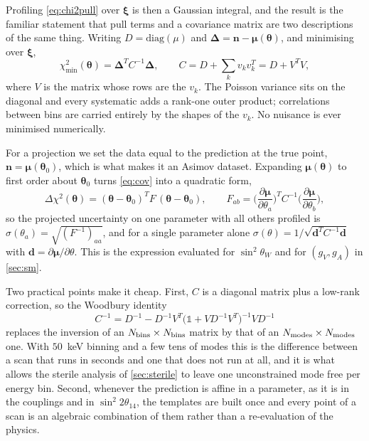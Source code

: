 \documentclass[aps,prd,superscriptaddress,nofootinbib,longbibliography,notitlepage,11pt]{revtex4-2}
\newcommand{\sw}{\sin^2\theta_W}
\newcommand{\st}[1]{\sin^2 2\theta_{#1}}
\begin{document}
Profiling \cref{eq:chi2pull} over $\bm\xi$ is then a Gaussian integral, and the result is
the familiar statement that pull terms and a covariance matrix are two descriptions of the
same thing.  Writing $D=\mathrm{diag}(\mu)$ and $\bm\Delta=\bm n-\bm\mu(\bm\theta)$, and
minimising over $\bm\xi$,
\begin{equation}
\chi^2_{\min}(\bm\theta)=\bm\Delta^{T}C^{-1}\bm\Delta,
\qquad
C=D+\sum_k v_kv_k^{T}=D+V^{T}V,
\label{eq:cov}
\end{equation}
where $V$ is the matrix whose rows are the $v_k$.  The Poisson variance sits on the
diagonal and every systematic adds a rank-one outer product; correlations between bins are
carried entirely by the shapes of the $v_k$.  No nuisance is ever minimised numerically.

For a projection we set the data equal to the prediction at the true point,
$\bm n=\bm\mu(\bm\theta_0)$, which is what makes it an Asimov dataset.  Expanding
$\bm\mu(\bm\theta)$ to first order about $\bm\theta_0$ turns \cref{eq:cov} into a quadratic
form,
\begin{equation}
\Delta\chi^2(\bm\theta)=(\bm\theta-\bm\theta_0)^{T}F\,(\bm\theta-\bm\theta_0),
\qquad
F_{ab}=\Big(\frac{\partial\bm\mu}{\partial\theta_a}\Big)^{T}C^{-1}
\Big(\frac{\partial\bm\mu}{\partial\theta_b}\Big),
\label{eq:fisher}
\end{equation}
so the projected uncertainty on one parameter with all others profiled is
$\sigma(\theta_a)=\sqrt{(F^{-1})_{aa}}$, and for a single parameter alone
$\sigma(\theta)=1/\sqrt{\bm d^{T}C^{-1}\bm d}$ with $\bm d=\partial\bm\mu/\partial\theta$.
This is the expression evaluated for $\sw$ and for $(g_V,g_A)$ in \cref{sec:sm}.

Two practical points make it cheap.  First, $C$ is a diagonal matrix plus a low-rank
correction, so the Woodbury identity
\begin{equation}
C^{-1}=D^{-1}-D^{-1}V^{T}\big(\mathbb{1}+VD^{-1}V^{T}\big)^{-1}VD^{-1}
\label{eq:woodbury}
\end{equation}
replaces the inversion of an $N_{\rm bins}\times N_{\rm bins}$ matrix by that of an
$N_{\rm modes}\times N_{\rm modes}$ one.  With $50$~keV binning and a few tens of modes this
is the difference between a scan that runs in seconds and one that does not run at all, and
it is what allows the sterile analysis of \cref{sec:sterile} to leave one unconstrained mode
free per energy bin.  Second, whenever the prediction is affine in a parameter, as it is in
the couplings and in $\st{14}$, the templates are built once and every point of a scan is an
algebraic combination of them rather than a re-evaluation of the physics.
\end{document}
